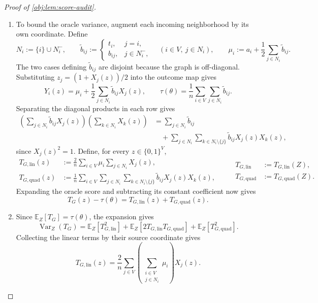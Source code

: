\begin{proof}[Proof of \cref{obj:lem:score-audit}]
\begin{enumerate}
\item To bound the oracle variance, augment each incoming neighborhood by its own coordinate. Define
\[
N_i:=\{i\}\cup N_i^-,
\qquad
\widetilde b_{ij}:=
\begin{cases}
t_i,&j=i,\\
b_{ij},&j\in N_i^-,
\end{cases}
\quad(i\in V,\ j\in N_i),
\qquad
\mu_i:=a_i+\frac12\sum_{j\in N_i}\widetilde b_{ij}.
\]
The two cases defining \(\widetilde b_{ij}\) are disjoint because the graph is off-diagonal. Substituting \(z_j=(1+X_j(z))/2\) into the outcome map gives
\[
Y_i(z)=\mu_i+\frac12\sum_{j\in N_i}\widetilde b_{ij}X_j(z),
\qquad
\tau(\theta)=\frac1n\sum_{i\in V}\sum_{j\in N_i}\widetilde b_{ij}.
\]
Separating the diagonal products in each row gives
\[
\begin{aligned}
\left(\sum_{j\in N_i}\widetilde b_{ij}X_j(z)\right)
\left(\sum_{k\in N_i}X_k(z)\right)
&=\sum_{j\in N_i}\widetilde b_{ij}\\
&\quad+\sum_{j\in N_i}\sum_{k\in N_i\setminus\{j\}}
\widetilde b_{ij}X_j(z)X_k(z),
\end{aligned}
\]
since \(X_j(z)^2=1\). Define, for every \(z\in\{0,1\}^{V}\),
\[
\begin{aligned}
T_{G,\mathrm{lin}}(z)
&:=\frac2n\sum_{i\in V}\mu_i\sum_{j\in N_i}X_j(z),\\
T_{G,\mathrm{quad}}(z)
&:=\frac1n\sum_{i\in V}\sum_{j\in N_i}
 \sum_{k\in N_i\setminus\{j\}}\widetilde b_{ij}X_j(z)X_k(z),
\end{aligned}
\qquad
\begin{aligned}
T_{G,\mathrm{lin}}&:=T_{G,\mathrm{lin}}(Z),\\
T_{G,\mathrm{quad}}&:=T_{G,\mathrm{quad}}(Z).
\end{aligned}
\]
Expanding the oracle score and subtracting its constant coefficient now gives
\[
T_G(z)-\tau(\theta)
=T_{G,\mathrm{lin}}(z)+T_{G,\mathrm{quad}}(z).
\]

\item Since \(\mathbb E_Z[T_G]=\tau(\theta)\), the expansion gives
\[
\operatorname{Var}_Z(T_G)
=
\mathbb E_Z[T_{G,\mathrm{lin}}^2]
+\mathbb E_Z[2T_{G,\mathrm{lin}}T_{G,\mathrm{quad}}]
+\mathbb E_Z[T_{G,\mathrm{quad}}^2].
\]
Collecting the linear terms by their source coordinate gives
\[
T_{G,\mathrm{lin}}(z)
=
\frac2n\sum_{j\in V}
\left(\sum_{\substack{i\in V\\j\in N_i}}\mu_i\right)X_j(z).
\]


\end{enumerate}
\end{proof}
